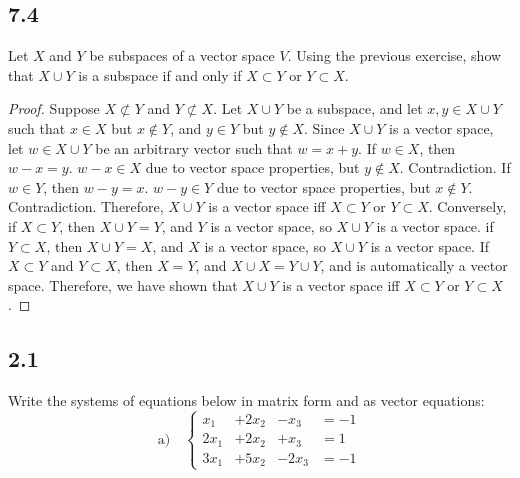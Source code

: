 \documentclass{amsart}
\begin{document}
\subsection*{7.4} Let $X$ and $Y$ be subspaces of a vector space $V$. Using the previous exercise, show that $X \cup Y$ is a subspace if and only if $X \subset Y$ or $Y \subset X$. 
\begin{proof}
    Suppose $X \not \subset Y$ and $Y \not \subset X$. Let $X \cup Y$ be a subspace, and let $x,y \in X \cup Y$ such that $x \in X$ but $x \not \in Y$, and $y \in Y$ but $y \not \in X$. Since $X \cup Y$ is a vector space, let $w \in X \cup Y$ be an arbitrary vector such that $w = x+y$. If $w \in X$, then $w - x = y$. $w-x \in X$ due to vector space properties, but $y \not \in X$. Contradiction. If $w \in Y$, then $w - y = x$. $w-y \in Y$ due to vector space properties, but $x \not \in Y$. Contradiction. Therefore, $X\cup Y$ is a vector space iff $X \subset Y$ or $Y \subset X$. Conversely, if $X \subset Y$, then $X\cup Y = Y$, and $Y$ is a vector space, so $X \cup Y$ is a vector space. if $Y \subset X$, then $X\cup Y = X$, and $X$ is a vector space, so $X \cup Y$ is a vector space. If $X \subset Y$ and $Y \subset X$, then $X = Y$, and $X \cup X = Y \cup Y$, and is automatically a vector space. Therefore, we have shown that $X\cup Y$ is a vector space iff $X \subset Y$ or $Y \subset X$. 
\end{proof}
\subsection*{2.1} Write the systems of equations below in matrix form and as vector equations:
\[
\text{a)} \quad
\left\{
\begin{aligned}
x_1 &+ 2x_2 &- x_3 &= -1 \\
2x_1 &+ 2x_2 &+ x_3 &= 1 \\
3x_1 &+ 5x_2 &- 2x_3 &= -1
\end{aligned}
\right.
\]
\end{document}

